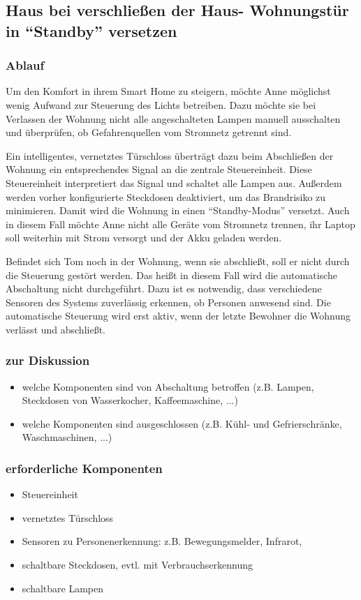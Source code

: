 \documentclass[12pt, oneside, smallheadings]{scrbook}
\begin{document}
\subsection{Haus bei verschließen der Haus- Wohnungstür in "`Standby"' versetzen}
\subsubsection{Ablauf}
Um den Komfort in ihrem Smart Home zu steigern, möchte Anne möglichst wenig Aufwand zur Steuerung des Lichts betreiben. Dazu möchte sie bei Verlassen der Wohnung nicht alle angeschalteten Lampen manuell ausschalten und überprüfen, ob Gefahrenquellen vom Stromnetz getrennt sind.

Ein intelligentes, vernetztes Türschloss überträgt dazu beim Abschließen der Wohnung ein entsprechendes Signal an die zentrale Steuereinheit. Diese Steuereinheit interpretiert das Signal und schaltet alle Lampen aus. Außerdem werden vorher konfigurierte Steckdosen deaktiviert, um das Brandrisiko zu minimieren. Damit wird die Wohnung in einen "`Standby-Modus"' versetzt. Auch in diesem Fall möchte Anne nicht alle Geräte vom Stromnetz trennen, ihr Laptop soll weiterhin mit Strom versorgt und der Akku geladen werden.

Befindet sich Tom noch in der Wohnung, wenn sie abschließt, soll er nicht durch die Steuerung gestört werden. Das heißt in diesem Fall wird die automatische Abschaltung nicht durchgeführt. Dazu ist es notwendig, dass verschiedene Sensoren des Systems zuverlässig erkennen, ob Personen anwesend sind. Die automatische Steuerung wird erst aktiv, wenn der letzte Bewohner die Wohnung verlässt und abschließt.

\subsubsection{zur Diskussion}
\begin{itemize}
	\item welche Komponenten sind von Abschaltung betroffen (z.B. Lampen, Steckdosen von Wasserkocher, Kaffeemaschine, ...)
	\item welche Komponenten sind ausgeschlossen (z.B. Kühl- und Gefrierschränke, Waschmaschinen, ...)
\end{itemize}

\subsubsection{erforderliche Komponenten}
\begin{itemize}
	\item Steuereinheit
	\item vernetztes Türschloss
	\item Sensoren zu Personenerkennung: z.B. Bewegungsmelder, Infrarot, 
	\item schaltbare Steckdosen, evtl. mit Verbrauchserkennung
	\item schaltbare Lampen
\end{itemize}
\end{document}
